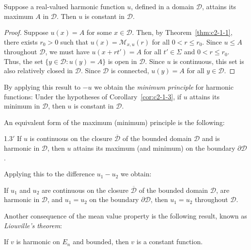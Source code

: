 \begin{corollary}\label{cor:c2-1-3}
Suppose a real-valued harmonic function $u$, defined in a domain $\mathcal{D}$, attains its maximum $A$ in $\mathcal{D}$. Then $u$ is constant in $\mathcal{D}$.
\end{corollary}

\begin{proof}
Suppose $u(x) = A$ for some $x \in \mathcal{D}$. Then, by Theorem~\ref{thm:c2-1-1}, there exists $r_0 > 0$ such that $u(x) = \mathcal{M}_{x,u}(r)$ for all $0 < r \leq r_0$. Since $u \leq A$ throughout $\mathcal{D}$, we must have $u(x + rt') = A$ for all $t' \in \Sigma$ and $0 < r \leq r_0$. Thus, the set $\{y \in \mathcal{D} : u(y) = A\}$ is open in $\mathcal{D}$. Since $u$ is continuous, this set is also relatively closed in $\mathcal{D}$. Since $\mathcal{D}$ is connected, $u(y) = A$ for all $y \in \mathcal{D}$.
\end{proof}

By applying this result to $-u$ we obtain the \emph{minimum principle} for harmonic functions: Under the hypotheses of Corollary~\ref{cor:c2-1-3}, if $u$ attains its minimum in $\mathcal{D}$, then $u$ is constant in $\mathcal{D}$.

An equivalent form of the maximum (minimum) principle is the following:

\begin{customcor}{1.3$'$}\label{cor:c2-1-3p}
If $u$ is continuous on the closure $\overline{\mathcal{D}}$ of the bounded domain $\mathcal{D}$ and is harmonic in $\mathcal{D}$, then $u$ attains its maximum (and minimum) on the boundary $\partial\mathcal{D}$.
\end{customcor}

Applying this to the difference $u_1 - u_2$ we obtain:

\begin{corollary}\label{cor:c2-1-4}
If $u_1$ and $u_2$ are continuous on the closure $\overline{\mathcal{D}}$ of the bounded domain $\mathcal{D}$, are harmonic in $\mathcal{D}$, and $u_1 = u_2$ on the boundary $\partial\mathcal{D}$, then $u_1 = u_2$ throughout $\mathcal{D}$.
\end{corollary}

Another consequence of the mean value property is the following result, known as \emph{Liouville's theorem}:

\begin{theorem}\label{thm:c2-1-5}
If $v$ is harmonic on $E_n$ and bounded, then $v$ is a constant function.
\end{theorem}

